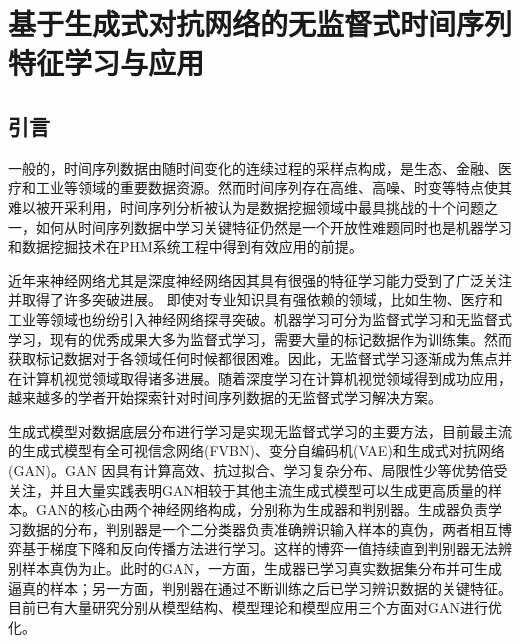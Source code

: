 
\chapter{基于生成式对抗网络的无监督式时间序列特征学习与应用}
\label{chap:gan}

\section{引言}

一般的，时间序列数据由随时间变化的连续过程的采样点构成\cite{langkvist2014review}，是生态、金融、医疗和工业等领域的重要数据资源\cite{esling2012time,gaber2005mining}。然而时间序列存在高维、高噪、时变等特点使其难以被开采利用，时间序列分析被认为是数据挖掘领域中最具挑战的十个问题之一，如何从时间序列数据中学习关键特征仍然是一个开放性难题\cite{langkvist2014review}同时也是机器学习和数据挖掘技术在PHM系统工程中得到有效应用的前提\cite{zhou2011latent, he2012integrated, patil2008failure, yan2004prognostic}。

近年来神经网络尤其是深度神经网络因其具有很强的特征学习能力受到了广泛关注并取得了许多突破进展\cite{lecun2015deep}。
即使对专业知识具有强依赖的领域，比如生物\cite{webb2018deep}、医疗\cite{mirowski2008comparing}和工业\cite{tsui2015prognostics}等领域也纷纷引入神经网络探寻突破。机器学习可分为监督式学习和无监督式学习，现有的优秀成果大多为监督式学习，需要大量的标记数据作为训练集\cite{radford2015unsupervised}。然而获取标记数据对于各领域任何时候都很困难。因此，无监督式学习逐渐成为焦点并在计算机视觉领域取得诸多进展\cite{lee2009convolutional,lecun2015deep,radford2015unsupervised}。随着深度学习在计算机视觉领域得到成功应用，越来越多的学者开始探索针对时间序列数据的无监督式学习解决方案\cite{langkvist2014review}。

生成式模型对数据底层分布进行学习是实现无监督式学习的主要方法，目前最主流的生成式模型有全可视信念网络(FVBN)\cite{frey1998graphical}、变分自编码机(VAE)\cite{russakovsky2015imagenet}和生成式对抗网络(GAN)\cite{goodfellow2014generative}。GAN 因具有计算高效、抗过拟合、学习复杂分布、局限性少等优势倍受关注，并且大量实践表明GAN相较于其他主流生成式模型可以生成更高质量的样本。GAN的核心由两个神经网络构成，分别称为生成器和判别器。生成器负责学习数据的分布，判别器是一个二分类器负责准确辨识输入样本的真伪，两者相互博弈基于梯度下降和反向传播方法进行学习。这样的博弈一值持续直到判别器无法辨别样本真伪为止。此时的GAN，一方面，生成器已学习真实数据集分布并可生成逼真的样本；另一方面，判别器在通过不断训练之后已学习辨识数据的关键特征。目前已有大量研究分别从模型结构\cite{mirza2014conditional,denton2015deep,radford2015unsupervised}、模型理论\cite{chen2016infogan,arjovsky2017wasserstein}和模型应用\cite{isola2017image,ledig2016photo,reed2016generative,salimans2016improved}三个方面对GAN进行优化。

